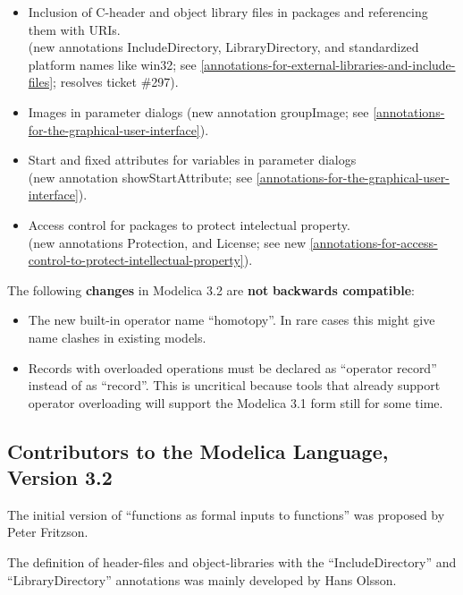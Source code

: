 \documentclass[10pt,a4paper]{report}
\def\doublelabel#1{\label{#1}}
\begin{document}
\begin{itemize}
  \begin{itemize}
  \item
    Inclusion of C-header and object library files in packages and
    referencing them with URIs.\\
    (new annotations IncludeDirectory, LibraryDirectory, and
    standardized platform names like win32; see \ref{annotations-for-external-libraries-and-include-files}; resolves
    ticket \#297).
  \item
    Images in parameter dialogs (new annotation groupImage; see 
    \ref{annotations-for-the-graphical-user-interface}).
  \item
    Start and fixed attributes for variables in parameter dialogs\\
    (new annotation showStartAttribute; see \ref{annotations-for-the-graphical-user-interface}).
  \item
    Access control for packages to protect intelectual property.\\
    (new annotations Protection, and License; see new \ref{annotations-for-access-control-to-protect-intellectual-property}).
  \end{itemize}
\end{itemize}

The following \textbf{changes} in Modelica 3.2 are \textbf{not}
\textbf{backwards compatible}:

\begin{itemize}
\item
  The new built-in operator name ``homotopy''. In rare cases this might
  give name clashes in existing models.
\item
  Records with overloaded operations must be declared as ``operator
  record'' instead of as ``record''. This is uncritical because tools
  that already support operator overloading will support the Modelica
  3.1 form still for some time.
\end{itemize}

\subsection{Contributors to the Modelica Language, Version 3.2}\doublelabel{contributors-to-the-modelica-language-version-3-2}

The initial version of ``functions as formal inputs to functions'' was
proposed by Peter Fritzson.

The definition of header-files and object-libraries with the
``IncludeDirectory'' and ``LibraryDirectory'' annotations was mainly
developed by Hans Olsson.
\end{document}
